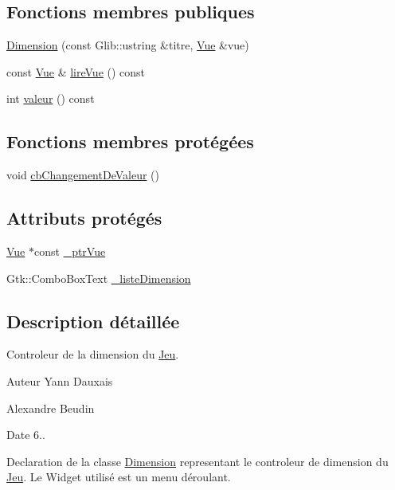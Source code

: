 \subsection*{Fonctions membres publiques}
\begin{DoxyCompactItemize}
\item 
\hyperlink{classgrenouilloland_1_1Dimension_ac90aede2a2de82759014e3ff8f4eed6f}{Dimension} (const Glib\-::ustring \&titre, \hyperlink{classgrenouilloland_1_1Vue}{Vue} \&vue)
\item 
const \hyperlink{classgrenouilloland_1_1Vue}{Vue} \& \hyperlink{classgrenouilloland_1_1Dimension_a7daf1ff22e3c4d1085c35ff7b333760b}{lire\-Vue} () const 
\item 
int \hyperlink{classgrenouilloland_1_1Dimension_a3d82e721e31be8656926fc157f38ea1c}{valeur} () const 
\end{DoxyCompactItemize}
\subsection*{Fonctions membres protégées}
\begin{DoxyCompactItemize}
\item 
void \hyperlink{classgrenouilloland_1_1Dimension_a7415e793d4ea98afe30864e81e00e48b}{cb\-Changement\-De\-Valeur} ()
\end{DoxyCompactItemize}
\subsection*{Attributs protégés}
\begin{DoxyCompactItemize}
\item 
\hyperlink{classgrenouilloland_1_1Vue}{Vue} $\ast$const \hyperlink{classgrenouilloland_1_1Dimension_a5b66fbce9d7f6eed85d39f90bb71d7c7}{\-\_\-ptr\-Vue}
\item 
Gtk\-::\-Combo\-Box\-Text \hyperlink{classgrenouilloland_1_1Dimension_aea2f6714737f26588395db30cb0385bd}{\-\_\-liste\-Dimension}
\end{DoxyCompactItemize}


\subsection{Description détaillée}
Controleur de la dimension du \hyperlink{classgrenouilloland_1_1Jeu}{Jeu}. 

\begin{DoxyAuthor}{Auteur}
Yann Dauxais 

Alexandre Beudin 
\end{DoxyAuthor}
\begin{DoxyDate}{Date}
6..
\end{DoxyDate}
Declaration de la classe \hyperlink{classgrenouilloland_1_1Dimension}{Dimension} representant le controleur de dimension du \hyperlink{classgrenouilloland_1_1Jeu}{Jeu}. Le Widget utilisé est un menu déroulant.

